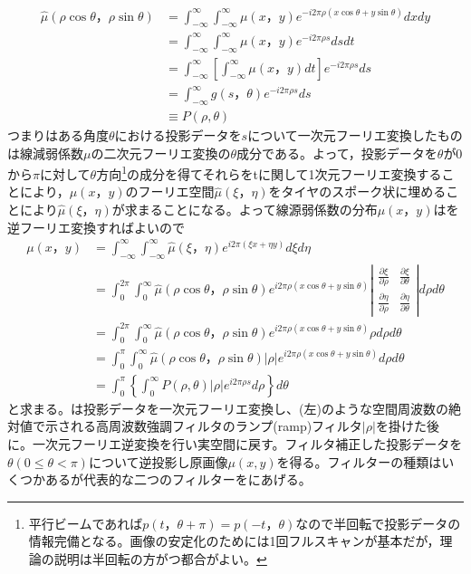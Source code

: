 \begin{align}
\hat{\mu}(\rho\cos{\theta}，\rho\sin{\theta})&=\int^{\infty}_{-\infty}\int^{\infty}_{-\infty}\mu(x，y)e^{-i2\pi\rho(x\cos{\theta}+y\sin{\theta})}dxdy\\&=\int^{\infty}_{-\infty}\int^{\infty}_{-\infty}\mu(x，y)e^{-i2\pi\rho s}dsdt\\
&=\int^{\infty}_{-\infty}\left[\int^{\infty}_{-\infty}\mu(x，y)dt\right]e^{-i2\pi\rho s}ds\\
&=\int^{\infty}_{-\infty}g(s，\theta)e^{-i2\pi\rho s}ds\\\label{eq:mu_hat}
&\equiv P(\rho,\theta)
\end{align}
つまりはある角度$\theta$における投影データを$s$について一次元フーリエ変換したものは線減弱係数$\mu$の二次元フーリエ変換の$\theta$成分である。よって，投影データを$\theta$が0から$\pi$に対して$\theta$方向\footnote{平行ビームであれば$p(t，\theta+\pi)=p(-t，\theta)$なので半回転で投影データの情報完備となる。画像の安定化のためには1回フルスキャンが基本だが，理論の説明は半回転の方がつ都合がよい。}の成分を得てそれらをtに関して1次元フーリエ変換することにより，$\mu(x，y)$のフーリエ空間$\hat{\mu}(\xi，\eta)$をタイヤのスポーク状に埋めることにより$\hat{\mu}(\xi，\eta)$が求まることになる。よって線源弱係数の分布$\mu(x，y)$はを逆フーリエ変換すればよいので
\begin{align}
\mu(x，y)&= \int^{\infty}_{-\infty}\int^{\infty}_{-\infty}\hat{\mu}(\xi，\eta)e^{i2\pi(\xi x+\eta y)}d\xi d\eta\\
&= \int^{2\pi}_{0}\int^{\infty}_{0}\hat{\mu}(\rho\cos{\theta}，\rho\sin{\theta})e^{i2\pi\rho(x\cos{\theta} +y\sin{\theta} )} \displaystyle\left|
    \begin{array}{cc}
      \displaystyle\frac{\partial \xi}{\partial \rho} &  \displaystyle\frac{\partial \xi}{\partial \theta}  \\
      \displaystyle\frac{\partial \eta}{\partial \rho}  &  \displaystyle\frac{\partial \eta}{\partial \theta} 
    \end{array}
  \right|d\rho d\theta\\
  &= \int^{2\pi}_{0}\int^{\infty}_{0}\hat{\mu}(\rho\cos{\theta}，\rho\sin{\theta})e^{i2\pi\rho(x\cos{\theta} +y\sin{\theta} )} \rho d\rho d\theta\\
  &= \int^{\pi}_{0}\int^{\infty}_{0}\hat{\mu}(\rho\cos{\theta}，\rho\sin{\theta})|\rho|e^{i2\pi\rho(x\cos{\theta} +y\sin{\theta} )}  d\rho d\theta\\
    &= \int^{\pi}_{0}\left\{\int^{\infty}_{0}P(\rho,\theta)|\rho|e^{i2\pi\rho s}  d\rho\right\} d\theta\label{eq:FBP_end}
\end{align}
と求まる。は投影データを一次元フーリエ変換し、(左)のような空間周波数の絶対値で示される高周波数強調フィルタのランプ(ramp)フィルタ$|\rho|$を掛けた後に。一次元フーリエ逆変換を行い実空間に戻す。フィルタ補正した投影データを$\theta(0\leq\theta<\pi)$について逆投影し原画像$\mu(x,y)$を得る。フィルターの種類はいくつかあるが代表的な二つのフィルターをにあげる。

